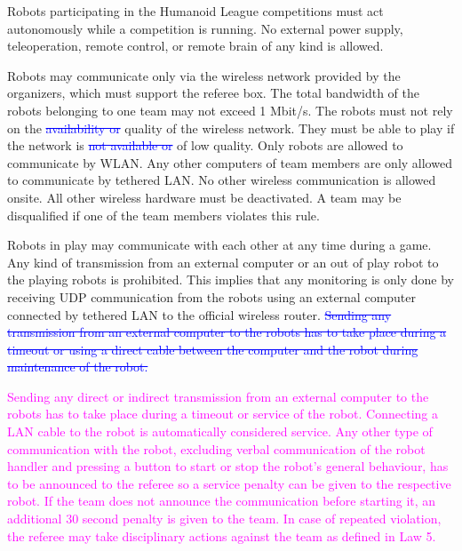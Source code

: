 \headlinebox

Robots participating in the Humanoid League competitions must act autonomously while a competition is running. No external power supply, teleoperation, remote control, or remote brain of any kind is allowed.

\bigskip

Robots may communicate only via the wireless network provided by the organizers, which must support the referee box. The total bandwidth of the robots belonging to one team may not exceed 1 Mbit/s. The robots must not rely on the \textcolor{blue}{\sout{availability or}} quality of the wireless network. They
must be able to play if the network is \textcolor{blue}{\sout{not available or}} of low quality. Only robots are allowed to communicate by WLAN. Any other computers of team members are only allowed to communicate by tethered LAN. No other wireless communication is allowed onsite. All other wireless hardware must be deactivated. A team may be disqualified if one of the team members violates this rule.

\bigskip

Robots in play may communicate with each other at any time during a game. Any kind of transmission from an external computer or an out of play robot to the playing robots is prohibited. This implies that any monitoring is only done by receiving UDP communication from the robots using an external computer connected by tethered LAN to the official wireless router. \textcolor{blue}{\sout{Sending any transmission from an external computer to the robots has to take place during a timeout or using a direct cable between the computer and the robot during maintenance of the robot.}}

\bigskip

\textcolor{magenta}{Sending any direct or indirect transmission from an external computer to the robots has to take place during a timeout or service of the robot. Connecting a LAN cable to the robot is automatically considered service. Any other type of communication with the robot, excluding verbal communication of the robot handler and pressing a button to start or stop the robot's general behaviour, has to be announced to the referee so a service penalty can be given to the respective robot. If the team does not announce the communication before starting it, an additional 30 second penalty is given to the team. In case of repeated violation, the referee may take disciplinary actions against the team as defined in Law 5.}
\bigskip

